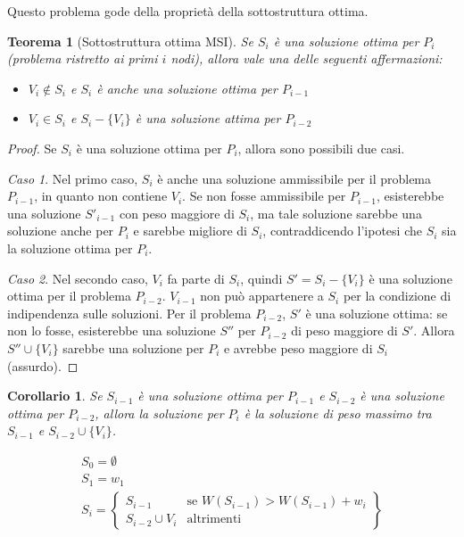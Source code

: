 \documentclass[11pt]{book}
\newtheorem*{theorem}{Teorema}
\newtheorem*{corollary}{Corollario}
\begin{document}
Questo problema gode della proprietà della sottostruttura ottima.
\begin{theorem}[Sottostruttura ottima MSI]
    Se $S_i$ è una soluzione ottima per $P_i$ (problema ristretto ai primi $i$ nodi), allora vale una delle seguenti affermazioni:
    \begin{itemize}
        \item $V_i \notin S_i$ e $S_i$ è anche una soluzione ottima per $P_{i-1}$
        \item $V_i \in S_i$ e $S_i-\{V_i\}$ è una soluzione attima per $P_{i-2}$
    \end{itemize}
\end{theorem}
\begin{proof}
    Se $S_i$ è una soluzione ottima per $P_i$, allora sono possibili due casi.

    \textit{Caso 1}. Nel primo caso, $S_i$ è anche una soluzione ammissibile per il problema $P_{i-1}$, in quanto non contiene 
    $V_i$. Se non fosse ammissibile per $P_{i-1}$, esisterebbe una soluzione $S'_{i-1}$ con peso maggiore di $S_i$, ma tale 
    soluzione sarebbe una soluzione anche per $P_i$ e sarebbe migliore di $S_i$, contraddicendo l'ipotesi che $S_i$ sia 
    la soluzione ottima per $P_i$.

    \textit{Caso 2}. Nel secondo caso, $V_i$ fa parte di $S_i$, quindi $S'=S_i-\{V_i\}$ è una soluzione ottima per il problema 
    $P_{i-2}$. $V_{i-1}$ non può appartenere a $S_i$ per la condizione di indipendenza sulle soluzioni. Per il problema 
    $P_{i-2}$, $S'$ è una soluzione ottima: se non lo fosse, esisterebbe una soluzione $S''$ per $P_{i-2}$ di peso maggiore 
    di $S'$. Allora $S''\cup \{V_i\}$ sarebbe una soluzione per $P_i$ e avrebbe peso maggiore di $S_i$ (assurdo). 
\end{proof}
\begin{corollary}
    Se $S_{i-1}$ è una soluzione ottima per $P_{i-1}$ e $S_{i-2}$ è una soluzione ottima per $P_{i-2}$, allora la soluzione 
    per $P_i$ è la soluzione di peso massimo tra $S_{i-1}$ e $S_{i-2}\cup \{V_i\}$.
\end{corollary}
\begin{equation*}
    \begin{split}
        S_0=\emptyset\\
        S_1=w_1\\
        S_i = 
        \left\{
            \begin{array}{lr}
                S_{i-1}&\text{se } W(S_{i-1})> W(S_{i-1})+w_i\\
                S_{i-2}\cup V_i&\text{altrimenti}
            \end{array}
        \right\}
    \end{split}
\end{equation*}
\end{document}
